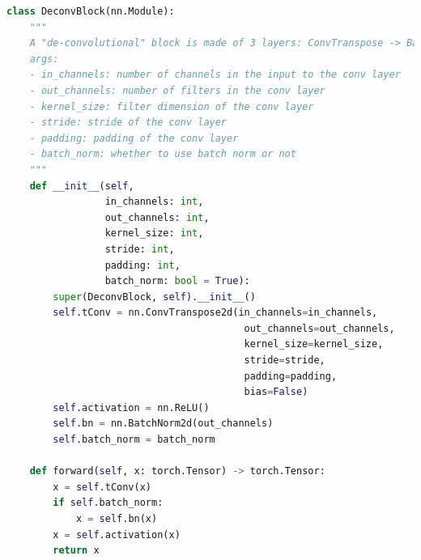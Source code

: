 \begin{lstlisting}[language=Python]
class DeconvBlock(nn.Module):
    """
    A "de-convolutional" block is made of 3 layers: ConvTranspose -> BatchNorm -> Activation.
    args:
    - in_channels: number of channels in the input to the conv layer
    - out_channels: number of filters in the conv layer
    - kernel_size: filter dimension of the conv layer
    - stride: stride of the conv layer
    - padding: padding of the conv layer
    - batch_norm: whether to use batch norm or not
    """
    def __init__(self, 
                 in_channels: int, 
                 out_channels: int, 
                 kernel_size: int, 
                 stride: int,
                 padding: int,
                 batch_norm: bool = True):
        super(DeconvBlock, self).__init__()
        self.tConv = nn.ConvTranspose2d(in_channels=in_channels,
                                         out_channels=out_channels, 
                                         kernel_size=kernel_size, 
                                         stride=stride, 
                                         padding=padding,
                                         bias=False)
        self.activation = nn.ReLU()
        self.bn = nn.BatchNorm2d(out_channels)
        self.batch_norm = batch_norm
        
    def forward(self, x: torch.Tensor) -> torch.Tensor:
        x = self.tConv(x)
        if self.batch_norm:
            x = self.bn(x)
        x = self.activation(x)
        return x
\end{lstlisting}

